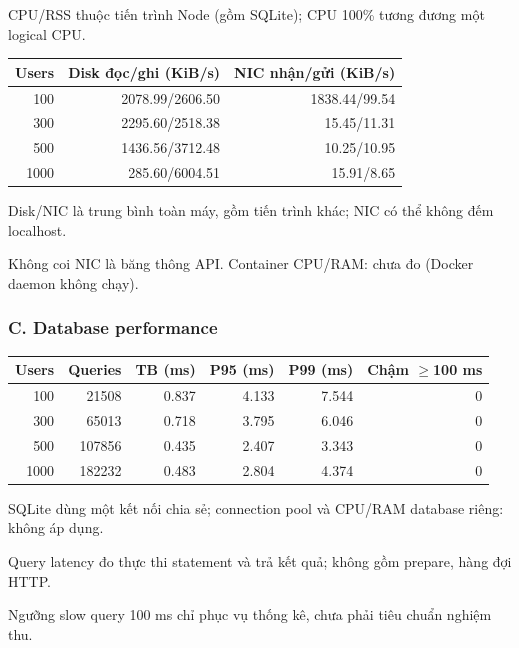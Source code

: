 CPU/RSS thuộc tiến trình Node (gồm SQLite); CPU 100\% tương đương một logical CPU.

\begin{center}\small
\setlength{\tabcolsep}{3pt}
\begin{tabular}{@{}rrr@{}}
\toprule
\textbf{Users} & \textbf{Disk đọc/ghi (KiB/s)} & \textbf{NIC nhận/gửi (KiB/s)} \\
\midrule
100 & 2078.99/2606.50 & 1838.44/99.54 \\
300 & 2295.60/2518.38 & 15.45/11.31 \\
500 & 1436.56/3712.48 & 10.25/10.95 \\
1000 & 285.60/6004.51 & 15.91/8.65 \\
\bottomrule
\end{tabular}
\end{center}

Disk/NIC là trung bình toàn máy, gồm tiến trình khác; NIC có thể không đếm localhost.

Không coi NIC là băng thông API. Container CPU/RAM: chưa đo (Docker daemon không chạy).

\subsubsection*{C. Database performance}

\begin{center}\small
\setlength{\tabcolsep}{3pt}
\begin{tabular}{@{}rrrrrr@{}}
\toprule
\textbf{Users} & \textbf{Queries} & \textbf{TB (ms)} & \textbf{P95 (ms)} & \textbf{P99 (ms)} & \textbf{Chậm $\geq$100 ms} \\
\midrule
100 & 21508 & 0.837 & 4.133 & 7.544 & 0 \\
300 & 65013 & 0.718 & 3.795 & 6.046 & 0 \\
500 & 107856 & 0.435 & 2.407 & 3.343 & 0 \\
1000 & 182232 & 0.483 & 2.804 & 4.374 & 0 \\
\bottomrule
\end{tabular}
\end{center}

SQLite dùng một kết nối chia sẻ; connection pool và CPU/RAM database riêng: không áp dụng.

Query latency đo thực thi statement và trả kết quả; không gồm prepare, hàng đợi HTTP.

Ngưỡng slow query 100 ms chỉ phục vụ thống kê, chưa phải tiêu chuẩn nghiệm thu.

